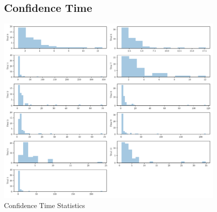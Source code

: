\documentclass{report}
\theoremstyle{definition}
\begin{document}
\begin{figure}[H]
\hspace*{-3cm}
\begin{minipage}{1.5\linewidth}
    \subsection{Confidence Time}
    \centering
    \centerline{
    \includegraphics[width=\textwidth]{exp1_stats_conf.pdf}}
    \caption{Confidence Time Statistics}
    \label{fig:exp1_stats_conf}
\end{minipage}
\end{figure}
\end{document}
